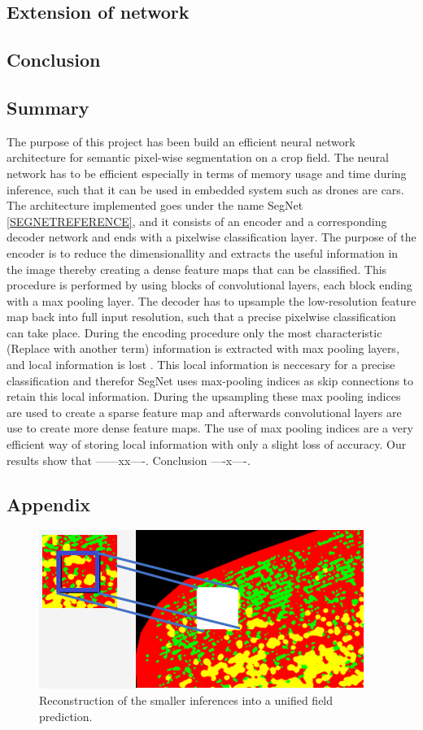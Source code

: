 \documentclass{article}
\begin{document}
\subsection{Extension of network}


\subsection{Conclusion}


 
\subsection{Summary}
The purpose of this project has been build an efficient neural network architecture for semantic pixel-wise segmentation on a crop field. The neural network has to be efficient especially in terms of memory usage and time during inference, such that it can be used in embedded system such as drones are cars. The architecture implemented goes under the name SegNet \ref{SEGNETREFERENCE}, and it consists of an encoder and a corresponding decoder network and ends with a pixelwise classification layer. The purpose of the encoder is to reduce the dimensionallity and extracts the useful information in the image thereby creating a dense feature maps that can be classified. This procedure is performed by using blocks of convolutional layers, each block ending with a max pooling layer. The decoder has to upsample the low-resolution feature map back into full input resolution, such that a precise pixelwise classification can take place. During the encoding procedure only the most characteristic (Replace with another term) information is extracted with max pooling layers, and local information is lost . This local information is neccesary for a precise classification and therefor SegNet uses max-pooling indices as skip connections to retain this local information. During the upsampling these max pooling indices are used to create a sparse feature map and afterwards convolutional layers are use to create more dense feature maps. The use of max pooling indices are a very efficient way of storing local information with only a slight loss of accuracy. Our results show that ------xx----. Conclusion ----x----.




\subsection{Appendix}
\begin{figure}[h!]
	\centering
	\includegraphics[width=0.7\linewidth]{"reconstruction DL"}
	\caption{Reconstruction of the smaller inferences into a unified field prediction.}
	\label{reconstruction_technique}
\end{figure}
\end{document}
